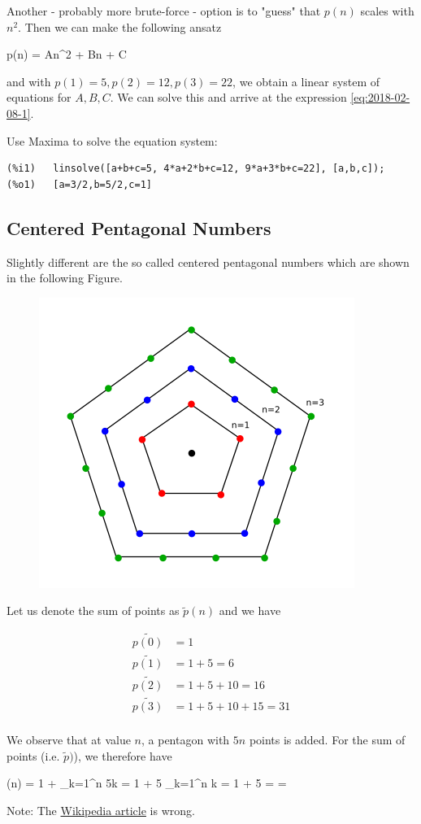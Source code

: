 Another - probably more brute-force - option is to "guess" that $p(n)$ scales with $n^2$. Then we can make the following ansatz

\bee
p(n) = An^2 + Bn + C
\eee

and with $p(1) = 5, p(2) = 12, p(3) = 22$, we obtain a linear system of equations for $A,B,C$. We can solve this and arrive at the expression \eqref{eq:2018-02-08-1}.


Use Maxima to solve the equation system:


\begin{verbatim}
(%i1)	linsolve([a+b+c=5, 4*a+2*b+c=12, 9*a+3*b+c=22], [a,b,c]);
(%o1)	[a=3/2,b=5/2,c=1]
\end{verbatim}

\subsection{Centered Pentagonal Numbers}

Slightly different are the so called centered pentagonal numbers which are shown in the following Figure.

\begin{figure}[H]
	\includegraphics[scale=1]{images/pentagon_numbers_centered.png}
\end{figure}

Let us denote the sum of points as $\tilde{p}(n)$ and we have

\begin{align*}
\tilde{p(0)} &= 1 \\
\tilde{p(1)} &= 1 + 5  = 6\\
\tilde{p(2)} &= 1 + 5 + 10 = 16\\
\tilde{p(3)} &= 1 + 5 +10 + 15 = 31\\
\end{align*}

We observe that at value $n$, a pentagon with $5n$ points is added. For the sum of points (i.e. $\tilde{p})$), we therefore have

\bee
{}(n) = 1 + \sum_{k=1}^n 5k = 1 + 5 \sum_{k=1}^n k = 1 + 5  = \cdots = 
\eee

Note: The \href{https://en.wikipedia.org/wiki/Centered_pentagonal_number}{Wikipedia article} is wrong.